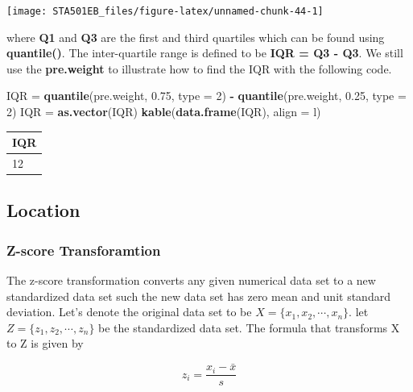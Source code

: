 \documentclass[
]{book}
\newenvironment{Shaded}{\begin{snugshade}}{\end{snugshade}}
\newcommand{\AttributeTok}[1]{\textcolor[rgb]{0.13,0.29,0.53}{#1}}
\newcommand{\DecValTok}[1]{\textcolor[rgb]{0.00,0.00,0.81}{#1}}
\newcommand{\FloatTok}[1]{\textcolor[rgb]{0.00,0.00,0.81}{#1}}
\newcommand{\FunctionTok}[1]{\textcolor[rgb]{0.13,0.29,0.53}{\textbf{#1}}}
\newcommand{\NormalTok}[1]{#1}
\newcommand{\OtherTok}[1]{\textcolor[rgb]{0.56,0.35,0.01}{#1}}
\newcommand{\SpecialCharTok}[1]{\textcolor[rgb]{0.81,0.36,0.00}{\textbf{#1}}}
\newcommand{\StringTok}[1]{\textcolor[rgb]{0.31,0.60,0.02}{#1}}
\begin{document}
\begin{center}\texttt{[image: STA501EB\_files/figure-latex/unnamed-chunk-44-1]} \end{center}

where \textbf{Q1} and \textbf{Q3} are the first and third quartiles which can be found using \textbf{quantile()}. The inter-quartile range is defined to be \textbf{IQR = Q3 - Q3}. We still use the \textbf{pre.weight} to illustrate how to find the IQR with the following code.

\begin{Shaded}
\begin{Highlighting}[]
\NormalTok{IQR }\OtherTok{=} \FunctionTok{quantile}\NormalTok{(pre.weight, }\FloatTok{0.75}\NormalTok{, }\AttributeTok{type =} \DecValTok{2}\NormalTok{) }\SpecialCharTok{{-}} \FunctionTok{quantile}\NormalTok{(pre.weight, }\FloatTok{0.25}\NormalTok{, }\AttributeTok{type =} \DecValTok{2}\NormalTok{)}
\NormalTok{IQR }\OtherTok{=} \FunctionTok{as.vector}\NormalTok{(IQR)}
\FunctionTok{kable}\NormalTok{(}\FunctionTok{data.frame}\NormalTok{(IQR), }\AttributeTok{align =} \StringTok{\textquotesingle{}l\textquotesingle{}}\NormalTok{)}
\end{Highlighting}
\end{Shaded}

\begin{tabular}{l}
\hline
IQR\\
\hline
12\\
\hline
\end{tabular}

\hypertarget{location}{%
\subsection{Location}\label{location}}

\hypertarget{z-score-transforamtion}{%
\subsubsection{Z-score Transforamtion}\label{z-score-transforamtion}}

The z-score transformation converts any given numerical data set to a new standardized data set such the new data set has zero mean and unit standard deviation. Let's denote the original data set to be \(X= \{x_1, x_2, \cdots, x_n\}\). let \(Z =\{z_1, z_2, \cdots, z_n \}\) be the standardized data set. The formula that transforms X to Z is given by

\[
z_i = \frac{x_i-\bar{x}}{s}
\]
\end{document}
